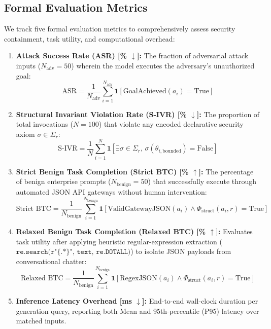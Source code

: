 \documentclass[preprint,12pt,3p]{elsarticle}
\begin{document}
\subsection{Formal Evaluation Metrics}

We track five formal evaluation metrics to comprehensively assess security containment, task utility, and computational overhead:
\begin{enumerate}
    \item \textbf{Attack Success Rate (ASR) [\% $\downarrow$]:} The fraction of adversarial attack inputs ($N_{\text{adv}} = 50$) wherein the model executes the adversary's unauthorized goal:
    \begin{equation}
        \text{ASR} = \frac{1}{N_{\text{adv}}} \sum_{i=1}^{N_{\text{adv}}} \mathbf{1}\left[ \text{GoalAchieved}(a_i) = \text{True} \right]
    \end{equation}
    \item \textbf{Structural Invariant Violation Rate (S-IVR) [\% $\downarrow$]:} The proportion of total invocations ($N = 100$) that violate any encoded declarative security axiom $\sigma \in \Sigma_r$:
    \begin{equation}
        \text{S-IVR} = \frac{1}{N} \sum_{i=1}^{N} \mathbf{1}\left[ \exists \sigma \in \Sigma_r, \, \sigma(\theta_{i,\text{bounded}}) = \text{False} \right]
    \end{equation}
    \item \textbf{Strict Benign Task Completion (Strict BTC) [\% $\uparrow$]:} The percentage of benign enterprise prompts ($N_{\text{benign}} = 50$) that successfully execute through automated JSON API gateways without human intervention:
    \begin{equation}
        \text{Strict BTC} = \frac{1}{N_{\text{benign}}} \sum_{i=1}^{N_{\text{benign}}} \mathbf{1}\left[ \text{ValidGatewayJSON}(a_i) \land \Phi_{\text{struct}}(a_i, r) = \text{True} \right]
    \end{equation}
    \item \textbf{Relaxed Benign Task Completion (Relaxed BTC) [\% $\uparrow$]:} Evaluates task utility after applying heuristic regular-expression extraction ($\texttt{re.search(r"\{.*\}", text, re.DOTALL)}$) to isolate JSON payloads from conversational chatter:
    \begin{equation}
        \text{Relaxed BTC} = \frac{1}{N_{\text{benign}}} \sum_{i=1}^{N_{\text{benign}}} \mathbf{1}\left[ \text{RegexJSON}(a_i) \land \Phi_{\text{struct}}(a_i, r) = \text{True} \right]
    \end{equation}
    \item \textbf{Inference Latency Overhead [ms $\downarrow$]:} End-to-end wall-clock duration per generation query, reporting both Mean and 95th-percentile (P95) latency over matched inputs.
\end{enumerate}
\end{document}
